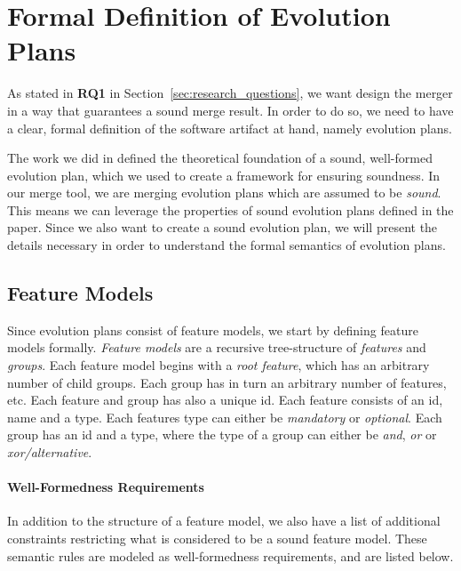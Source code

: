 \documentclass[a4paper,english]{ifimaster}
\begin{document}
\section{Formal Definition of Evolution Plans}%
\label{sec:formal_definition_of_evolution_plans}

As stated in \textbf{RQ1} in Section~\vref{sec:research_questions}, we want design the merger in a way that guarantees a sound merge result. In order to do so, we need to have a clear, formal definition of the software artifact at hand, namely evolution plans.

The work we did in \cite{cite:consistency_preserving_evolution_planning} defined the theoretical foundation of a sound, well-formed evolution plan, which we used to create a framework for ensuring soundness. In our merge tool, we are merging evolution plans which are assumed to be \textit{sound}. This means we can leverage the properties of sound evolution plans defined in the paper. Since we also want to create a sound evolution plan, we will present the details necessary in order to understand the formal semantics of evolution plans.

\subsection{Feature Models}%
\label{sub:feature_models}

Since evolution plans consist of feature models, we start by defining feature models formally. \textit{Feature models} are a recursive tree-structure of \textit{features} and \textit{groups}. Each feature model begins with a \textit{root feature}, which has an arbitrary number of child groups. Each group has in turn an arbitrary number of features, etc. Each feature and group has also a unique id. Each feature consists of an id, name and a type. Each features type can either be \textit{mandatory} or \textit{optional}. Each group has an id and a type, where the type of a group can either be \textit{and}, \textit{or} or \textit{xor/alternative}.

\paragraph{Well-Formedness Requirements}%
\label{par:well_formedness_requirements}

In addition to the structure of a feature model, we also have a list of additional constraints restricting what is considered to be a sound feature model. These semantic rules are modeled as well-formedness requirements, and are listed below.
\end{document}
